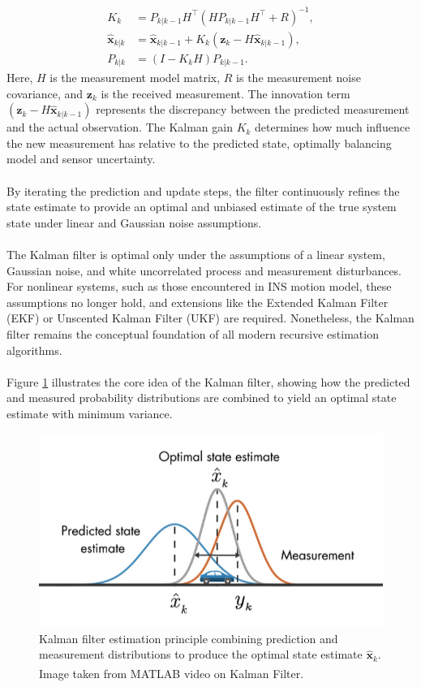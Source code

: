 $$
\begin{aligned}
    K_k &= P_{k|k-1}H^\top(HP_{k|k-1}H^\top + R)^{-1}, \\
    \hat{\mathbf{x}}_{k|k} &= \hat{\mathbf{x}}_{k|k-1} + K_k(\mathbf{z}_k - H\hat{\mathbf{x}}_{k|k-1}), \\
    P_{k|k} &= (I - K_kH)P_{k|k-1}.
\end{aligned}
$$
Here, $H$ is the measurement model matrix, $R$ is the measurement noise covariance, and $\mathbf{z}_k$ is the received measurement. The innovation term $(\mathbf{z}_k - H\hat{\mathbf{x}}_{k|k-1})$ represents the discrepancy between the predicted measurement and the actual observation. The Kalman gain $K_k$ determines how much influence the new measurement has relative to the predicted state, optimally balancing model and sensor uncertainty.  
\\ \\
By iterating the prediction and update steps, the filter continuously refines the state estimate to provide an optimal and unbiased estimate of the true system state under linear and Gaussian noise assumptions.
\\ \\
The Kalman filter is optimal only under the assumptions of a linear system, Gaussian noise, and white uncorrelated process and measurement disturbances. For nonlinear systems, such as those encountered in INS motion model, these assumptions no longer hold, and extensions like the Extended Kalman Filter (EKF) or Unscented Kalman Filter (UKF) are required. Nonetheless, the Kalman filter remains the conceptual foundation of all modern recursive estimation algorithms.  
\\ \\
Figure \ref{fig:state-estimation-kalman-filter} illustrates the core idea of the Kalman filter, showing how the predicted and measured probability distributions are combined to yield an optimal state estimate with minimum variance.
\begin{figure}[H]
    \centering
    \includegraphics[width=1.0\linewidth]{Pictures/State_Estimation/Kalman_Filter/State_Estimate_Illustrated.jpg}
    \caption{Kalman filter estimation principle combining prediction and measurement distributions to produce the optimal state estimate $\hat{\mathbf{x}}_k$. Image taken from MATLAB video on Kalman Filter.\textsuperscript{\cite{kalman_filter}}}
    \label{fig:state-estimation-kalman-filter}
\end{figure}
